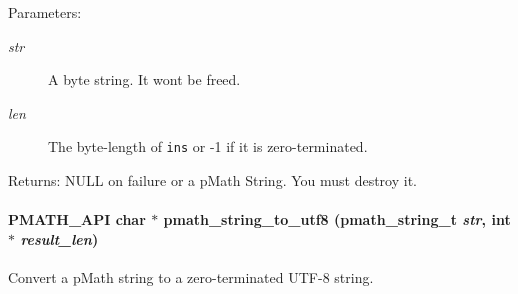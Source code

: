\begin{Desc}
\item[Parameters:]
\begin{description}
\item[{\em str}]A byte string. It wont be freed. \item[{\em len}]The byte-length of {\tt ins} or -1 if it is zero-terminated. \end{description}
\end{Desc}
\begin{Desc}
\item[Returns:]NULL on failure or a pMath String. You must destroy it. \end{Desc}
\hypertarget{group__strings_g881c2e70d81dd43a79d5ccbecc933e79}{
\paragraph[{pmath\_\-string\_\-to\_\-utf8}]{\setlength{\rightskip}{0pt plus 5cm}PMATH\_\-API char $\ast$ pmath\_\-string\_\-to\_\-utf8 ({\bf pmath\_\-string\_\-t} {\em str}, \/  int $\ast$ {\em result\_\-len})}\hfill}
\label{group__strings_g881c2e70d81dd43a79d5ccbecc933e79}


Convert a pMath string to a zero-terminated UTF-8 string. 

